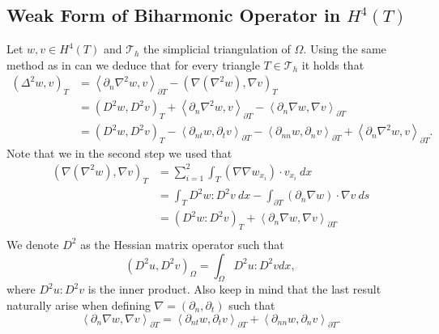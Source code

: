 \subsection{ Weak Form of Biharmonic Operator in $H^{4} \left( T  \right)$}%
\label{sub:weak_form_biharmonic_identity_for_triangles}


Let $w,v \in  H^{4} \left( T  \right) $ and $\mathcal{T}_{h} $ the simplicial triangulation of $\Omega$. Using the same method as in \cite{gu2012c0, brenner2012quadratic} can we
deduce that for every triangle $T \in  \mathcal{T}_{h} $ it holds that
\begin{align}
        \left( \Delta  ^{2} w, v \right) _{T} &= \left< \partial _{n} \nabla ^2 w, v \right>_{\partial T} - \left( \nabla \left( \nabla ^2 w
 \right), \nabla  v  \right)_{T} \nonumber   \\
\label{eq:weak_form_identity_1}
 &= \left( D^2w, D^2v \right)_{T} + \left< \partial _{n} \nabla ^2 w, v \right>_{\partial T}  - \left<\partial _{n}
 \nabla w, \nabla v \right>_{\partial T} \\
\label{eq:weak_form_identity_2}
 &=  \left( D^2 w, D^2 v \right)_{T} - \left<\partial _{nt} w, \partial _{t} v \right>_{\partial T} - \left<\partial
 _{nn} w, \partial _{n} v \right> _{\partial T} +  \left<\partial _{n} \nabla ^2 w, v \right>_{\partial T}
.\end{align}
Note that we in the second step we used that
\[
    \begin{split}
\left( \nabla \left( \nabla ^2 w \right), \nabla  v  \right)_{T} & = \sum_{i=1}^{2}  \int_{T}^{} \left( \nabla \nabla w_{x_{i}} \right)\cdot  v_{x_{i}} \ dx    \\
 & =  \int_{T}^{} D^2w: D^2v \ dx - \int_{\partial T}^{} \left( \partial _{n} \nabla w \right)
\cdot  \nabla v  \ ds \\
&= \left( D^2 w : D^2v  \right) _{ T} + \left<\partial _{n} \nabla w, \nabla v \right>_{\partial T }  \\
    \end{split}
\]
We denote $D^2$ as the Hessian matrix operator such that
$$( D^2u, D^2v )_{\Omega } = \int_{\Omega }^{} D^{2}u : D^2v  dx,$$
where $D^2u:D^2v$ is the inner product. Also keep in mind that the last result naturally arise when defining $\nabla  = \left( \partial _{n}, \partial _{t} \right) $ such that
\[
\left<\partial _{n} \nabla w, \nabla v \right>_{\partial T} = \left<\partial _{nt} w, \partial _{t} v\right> _{\partial
T} + \left< \partial _{nn} w, \partial _{n} v  \right> _{\partial T} .
\]


